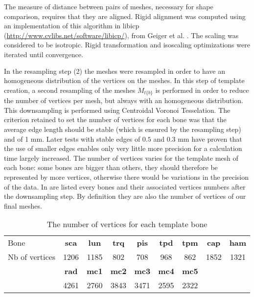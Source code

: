The measure of distance between pairs of meshes, necessary for shape comparison, requires that they are aligned. Rigid alignment was computed using an implementation of this algorithm in libicp (\url{http://www.cvlibs.net/software/libicp/}), from Geiger et al. \cite{geiger_2012_icp}. The scaling was considered to be isotropic. Rigid transformation and isoscaling optimizations were iterated until convergence. 

In the resampling step (2) the meshes were resampled in order to have an homogeneous distribution of the vertices on the meshes. In this step of template creation, a second resampling of the meshes $M_{t \{b\}}$ is performed in order to reduce the number of vertices per mesh, but always with an homogeneous distribution. This downsampling is performed using Centroidal Voronoi Tesselation. The criterion retained to set the number of vertices for each bone was that the average edge length should be stable (which is ensured by the resampling step) and of 1 mm. Later tests with stable edges of $0.5$ and $0.3$ mm have proven that the use of smaller edges enables only very little more precision for a calculation time largely increased. The number of vertices varies for the template mesh of each bone: some bones are bigger than others, they should therefore be represented by more vertices, otherwise there would be variations in the precision of the data. In  are listed every bones and their associated vertices numbers after the downsampling step. By definition they are also the number of vertices of our final meshes. 

\begin{table}[ht]
	\centering
	\begin{tabular}{lcccccccc}
		\toprule
		Bone & \bfseries sca & \bfseries lun & \bfseries trq & \bfseries pis & \bfseries tpd & \bfseries tpm	& \bfseries cap & \bfseries ham \\
		Nb of vertices & 1206	& 1185	& 802	& 708	& 968	& 862	& 1852	& 1321 	\\
		\midrule
		& \bfseries rad 	& \bfseries mc1 	& \bfseries mc2 	& \bfseries mc3 	& \bfseries mc4 	& \bfseries mc5 & \\
		& 4261 	& 2760 	& 3843 	& 3471 	& 2595 	& 2322 & \\
	 	\bottomrule
	\end{tabular}
\caption[The number of vertices of each template \mt*]{The number of vertices for each template bone \mt*}
\label{tab:3_nb_vertices}
\end{table}

